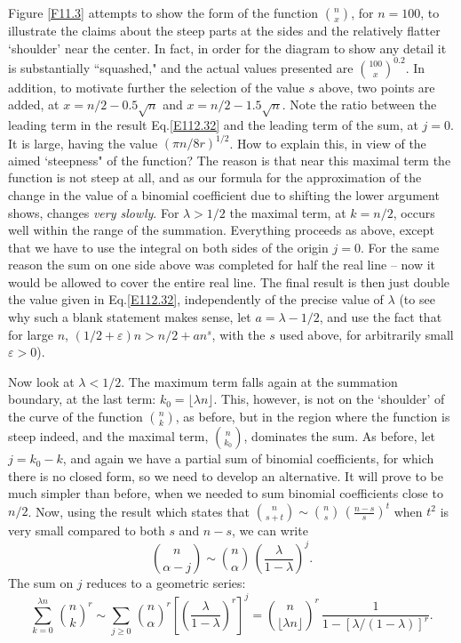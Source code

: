 \documentclass[11pt]{article}
\newcommand{\bc}{binomial coefficient\xspace}
\newcommand{\lp}{\left(}
\newcommand{\rp}{\right)}
\newcommand{\eps}{\ensuremath{\varepsilon}\xspace}
\begin{document}
Figure \ref{F11.3} attempts to show the form of the function $\binom{n}{x}$,
for $n=100$, to illustrate the claims about the steep parts at
the sides and the relatively flatter `shoulder' near the center.
In fact, in order for the diagram to show any detail it is
substantially ``squashed," and the actual values presented are 
$\binom{100}{x}^{0.2}$.  In addition, to motivate further the selection of
the value $s$ above, two points are added, at $x=n/2-0.5\sqrt{n}$ and
\vspace{1ex}
$x=n/2-1.5\sqrt{n}$.
Note the ratio between the leading term in the result Eq.\;\eqref{E112.32}
and the leading term of the sum, at $j=0$.  It is large, having the value
$(\pi n/8r)^{1/2}$.  How to explain this, in view of the aimed
`steepness" of the function?  The
reason is that near this maximal term the function is not steep at all,
and as our formula for the approximation of the change in the value of a
\bc due to shifting the lower argument shows, changes {\it very slowly}.
%
For $\lambda >1/2$ the maximal term, at $k=n/2$,
occurs well within the range of the
summation.  Everything proceeds as above, except that we have to use
the integral on both sides of the origin $j=0$.   For the same reason the
sum on one side above was completed for half the real line -- now
it would be allowed to cover the entire
real line. The final result is then just double the value given in
Eq.\;\eqref{E112.32}, independently of the precise value of $\lambda$
(to see why such a blank statement makes sense, let $a=\lambda-1/2$, and
use the fact that for large $n$, $(1/2 +\eps )n >n/2 + an^s$, with
the $s$ used above, for
arbitrarily small $\eps >0$). 

Now look at $\lambda < 1/2$. The maximum term falls again at the summation
boundary, at the last term: $k_0= \lfloor \lambda n \rfloor$.  This,
however, is not on the `shoulder' of the curve of the
function $\binom{n}{k}$, as before, but in the region where the function 
is steep indeed, and the maximal term,
$\binom{n}{k_0}$, dominates the sum.
As before, let $j=k_0 -k$, and again we have a partial sum of \bc{}s, for
which there is no closed form, so we need to develop an alternative.  It
will prove to be much simpler than before, when
we needed to sum \bc{}s close to $n/2$.
Now, using the result which states that
$\binom{n}{s+t} \sim \binom{n}{s}\,\lp \frac{n-s}{s} \rp^t $  
when $t^2$ is very small compared to both $s$ and $n-s$, we can write
$$
\binom{n}{\alpha -j} \sim \binom{n}{\alpha} \,\lp \frac{\lambda}{1-\lambda}
\rp^j .
$$
The sum on $j$ reduces to a geometric series: 
\begin{equation}\label{E112.24}
\sum_{k=0}^{\lambda n} \,\binom{n}{k}^r \sim \sum_{j\geq 0} \,\binom{n}{
\alpha}^r \left[ \lp \frac{\lambda}{1-\lambda} \rp^r \right]^j =
\binom{n}{\lfloor \lambda n \rfloor}^r \,\frac{1}{1-[\lambda
/(1-\lambda )]^r} .
\end{equation}
\end{document}
